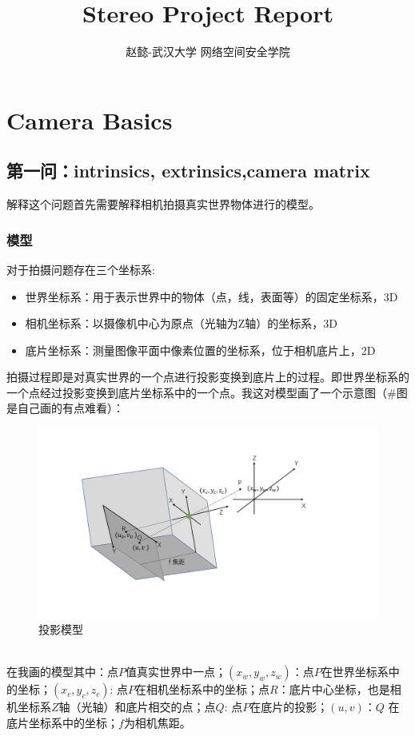 \documentclass[UTF8]{ctexart}
\begin{document}
\title{\textbf{Stereo Project Report}}
\author{赵懿-武汉大学 网络空间安全学院}
\maketitle
\section{Camera Basics}
\subsection{第一问：intrinsics, extrinsics,camera matrix}
解释这个问题首先需要解释相机拍摄真实世界物体进行的模型。
\subsubsection{模型}
对于拍摄问题存在三个坐标系\cite{CameraModels18830}:
\begin{itemize}
  \item 世界坐标系：用于表示世界中的物体（点，线，表面等）的固定坐标系，3D
  \item 相机坐标系：以摄像机中心为原点（光轴为Z轴）的坐标系，3D
  \item 底片坐标系：测量图像平面中像素位置的坐标系，位于相机底片上，2D
\end{itemize}
拍摄过程即是对真实世界的一个点进行投影变换到底片上的过程。即世界坐标系的一个点经过投影变换到底片坐标系中的一个点。我这对模型画了一个示意图（\#图是自己画的有点难看）：
\begin{figure}[htp]%
	\centering  %
	\includegraphics[width=0.5\linewidth]{./figures/model.pdf} %
	\caption{投影模型}  %
	\label{fig:model}   %
\end{figure}\\
在我画的模型其中：点$P$值真实世界中一点；$(x_w,y_w,z_w)$：点$P$在世界坐标系中的坐标；$(x_c,y_c,z_c)$: 点$P$在相机坐标系中的坐标；点$R$：底片中心坐标，也是相机坐标系$Z$轴（光轴）和底片相交的点；点$Q$: 点$P$在底片的投影；$(u,v)$：$Q$ 在底片坐标系中的坐标；$f$为相机焦距。\\
\end{document}

